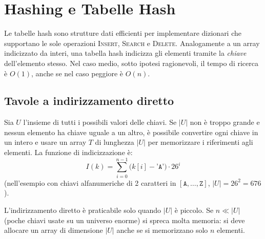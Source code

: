 
\section{Hashing e Tabelle Hash}

\begin{softnote}
	Le tabelle hash sono strutture dati efficienti per implementare dizionari
	che supportano le sole operazioni \textsc{Insert}, \textsc{Search} e
	\textsc{Delete}. Analogamente a un array indicizzato da interi, una tabella
	hash indicizza gli elementi tramite la \emph{chiave} dell'elemento stesso.
	Nel caso medio, sotto ipotesi ragionevoli, il tempo di ricerca è $O(1)$,
	anche se nel caso peggiore è $O(n)$.
\end{softnote}

\subsection{Tavole a indirizzamento diretto}

\begin{definizione}
	Sia $U$ l'insieme di tutti i possibili valori delle chiavi. Se $|U|$ non è
	troppo grande e nessun elemento ha chiave uguale a un altro, è possibile
	convertire ogni chiave in un intero e usare un array $T$ di lunghezza $|U|$
	per memorizzare i riferimenti agli elementi. La funzione di indicizzazione è:
	\[
	I(k) = \sum_{i=0}^{n-1} \bigl(k[i] - \texttt{'A'}\bigr) \cdot 26^i
	\]
	(nell'esempio con chiavi alfanumeriche di 2 caratteri in
	$[\texttt{A},\ldots,\texttt{Z}]$, $|U| = 26^2 = 676$).
\end{definizione}

\begin{hardnote}
	L'indirizzamento diretto è praticabile solo quando $|U|$ è piccolo. Se
	$n \ll |U|$ (poche chiavi usate su un universo enorme) si spreca molta
	memoria: si deve allocare un array di dimensione $|U|$ anche se si
	memorizzano solo $n$ elementi.
\end{hardnote}

